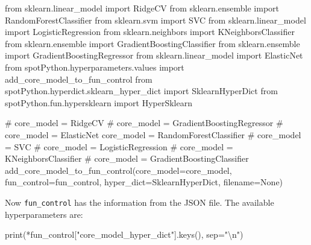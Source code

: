 \documentclass[
  letterpaper,
  DIV=11,
  numbers=noendperiod]{scrreprt}
\newenvironment{Shaded}{\begin{snugshade}}{\end{snugshade}}
\newcommand{\BuiltInTok}[1]{\textcolor[rgb]{0.00,0.23,0.31}{#1}}
\newcommand{\CharTok}[1]{\textcolor[rgb]{0.13,0.47,0.30}{#1}}
\newcommand{\CommentTok}[1]{\textcolor[rgb]{0.37,0.37,0.37}{#1}}
\newcommand{\ImportTok}[1]{\textcolor[rgb]{0.00,0.46,0.62}{#1}}
\newcommand{\NormalTok}[1]{\textcolor[rgb]{0.00,0.23,0.31}{#1}}
\newcommand{\OperatorTok}[1]{\textcolor[rgb]{0.37,0.37,0.37}{#1}}
\newcommand{\StringTok}[1]{\textcolor[rgb]{0.13,0.47,0.30}{#1}}
\newcommand{\VariableTok}[1]{\textcolor[rgb]{0.07,0.07,0.07}{#1}}
\begin{document}
\begin{Shaded}
\begin{Highlighting}[]
\ImportTok{from}\NormalTok{ sklearn.linear\_model }\ImportTok{import}\NormalTok{ RidgeCV}
\ImportTok{from}\NormalTok{ sklearn.ensemble }\ImportTok{import}\NormalTok{ RandomForestClassifier}
\ImportTok{from}\NormalTok{ sklearn.svm }\ImportTok{import}\NormalTok{ SVC}
\ImportTok{from}\NormalTok{ sklearn.linear\_model }\ImportTok{import}\NormalTok{ LogisticRegression}
\ImportTok{from}\NormalTok{ sklearn.neighbors }\ImportTok{import}\NormalTok{ KNeighborsClassifier}
\ImportTok{from}\NormalTok{ sklearn.ensemble }\ImportTok{import}\NormalTok{ GradientBoostingClassifier}
\ImportTok{from}\NormalTok{ sklearn.ensemble }\ImportTok{import}\NormalTok{ GradientBoostingRegressor}
\ImportTok{from}\NormalTok{ sklearn.linear\_model }\ImportTok{import}\NormalTok{ ElasticNet}
\ImportTok{from}\NormalTok{ spotPython.hyperparameters.values }\ImportTok{import}\NormalTok{ add\_core\_model\_to\_fun\_control}
\ImportTok{from}\NormalTok{ spotPython.hyperdict.sklearn\_hyper\_dict }\ImportTok{import}\NormalTok{ SklearnHyperDict}
\ImportTok{from}\NormalTok{ spotPython.fun.hypersklearn }\ImportTok{import}\NormalTok{ HyperSklearn}
\end{Highlighting}
\end{Shaded}

\begin{Shaded}
\begin{Highlighting}[]
\CommentTok{\# core\_model  = RidgeCV}
\CommentTok{\# core\_model = GradientBoostingRegressor}
\CommentTok{\# core\_model = ElasticNet}
\NormalTok{core\_model }\OperatorTok{=}\NormalTok{ RandomForestClassifier}
\CommentTok{\# core\_model = SVC}
\CommentTok{\# core\_model = LogisticRegression}
\CommentTok{\# core\_model = KNeighborsClassifier}
\CommentTok{\# core\_model = GradientBoostingClassifier}
\NormalTok{add\_core\_model\_to\_fun\_control(core\_model}\OperatorTok{=}\NormalTok{core\_model,}
\NormalTok{                              fun\_control}\OperatorTok{=}\NormalTok{fun\_control,}
\NormalTok{                              hyper\_dict}\OperatorTok{=}\NormalTok{SklearnHyperDict,}
\NormalTok{                              filename}\OperatorTok{=}\VariableTok{None}\NormalTok{)}
\end{Highlighting}
\end{Shaded}

Now \texttt{fun\_control} has the information from the JSON file. The
available hyperparameters are:

\begin{Shaded}
\begin{Highlighting}[]
\BuiltInTok{print}\NormalTok{(}\OperatorTok{*}\NormalTok{fun\_control[}\StringTok{"core\_model\_hyper\_dict"}\NormalTok{].keys(), sep}\OperatorTok{=}\StringTok{"}\CharTok{\textbackslash{}n}\StringTok{"}\NormalTok{)}
\end{Highlighting}
\end{Shaded}
\end{document}
